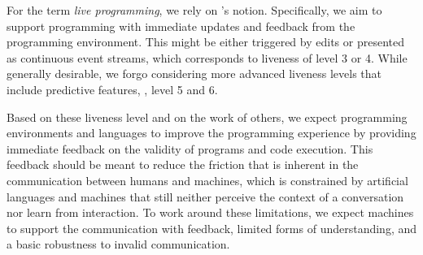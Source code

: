 \documentclass[sigconf, 10pt]{acmart}
\begin{document}

For the term \emph{live programming}, we rely on \citeauthor{Tanimoto:1990:Viva}'s notion.
Specifically, we aim to support programming
with immediate updates and feedback from the programming environment.
This might be either triggered by edits or presented as continuous event streams,
which corresponds to liveness of level 3 or 4\citep{Tanimoto:1990:Viva}.
While generally desirable, we forgo considering more advanced liveness levels
that include predictive features, \ie, level 5 and 6\citep{Tanimoto:2013:PEL}.

Based on these liveness level and on the work of others\citep{McDirmid:2007:LUL,Burckhardt:2013:ACF,Rein:2016:LLP},
we expect programming environments and languages
to improve the programming experience by providing immediate feedback on
the validity of programs and code execution.
This feedback should be meant to reduce the friction
that is inherent in the communication between humans and machines,
which is constrained by artificial languages and machines
that still neither perceive the context of a conversation nor learn from interaction.
To work around these limitations,
we expect machines to support the communication with feedback,
limited forms of understanding,
and a basic robustness to invalid communication.
\end{document}
